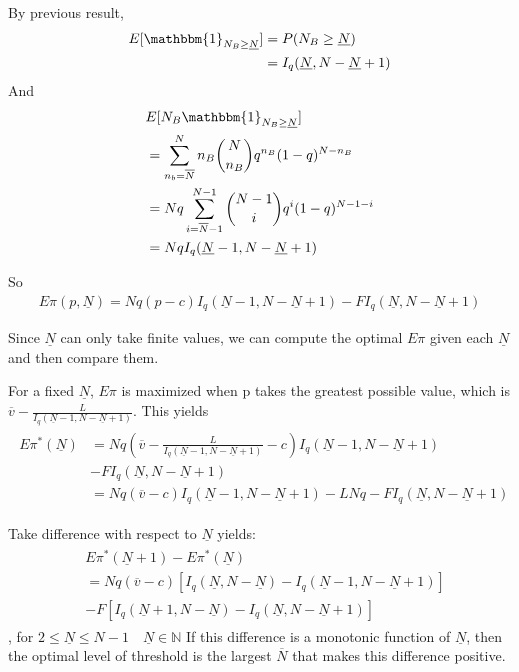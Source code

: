 \documentclass{article}
\begin{document}
By previous result,
\begin{align*}
    E[\mathbbm{1}_{N_B \geq \underline{N}}] &= P(N_B \geq \underline{N}) \\
    &= I_q(\underline{N}, N - \underline{N} + 1)
\end{align*}
And \begin{align*}
    &E[N_B \mathbbm{1}_{N_B \geq \underline{N}}]\\
    & = \sum_{n_b=\overline{N}}^{N} n_B \binom{N}{n_B} q^{n_B} (1-q)^{N-n_B}\\
    & = Nq \sum_{i=\overline{N}-1}^{N-1} \binom{N-1}{i} q^{i} (1-q)^{N-1-i}\\
    & = Nq I_q(\underline{N}-1, N - \underline{N} + 1)
\end{align*}

So \begin{align}
    E\pi(p,\underline{N}) = Nq(p-c)I_q(\underline{N}-1, N - \underline{N} + 1) - F I_q(\underline{N}, N - \underline{N} + 1)
\end{align}

Since $\underline{N}$ can only take finite values, we can
compute the optimal $E\pi$ given each $\underline{N}$ and
then compare them.

For a fixed $\underline{N}$, $E\pi$ is maximized when
p takes the greatest possible value, which is
$\overline{v} - \frac{L}{I_q(\underline{N}-1, N - \underline{N} + 1)}$.
This yields
\begin{align}
    \begin{split}
    E\pi^*(\underline{N}) 
    &= Nq(\overline{v} - \frac{L}{I_q(\underline{N}-1, N - \underline{N} + 1)} -c)
    I_q(\underline{N}-1, N - \underline{N} + 1) \\ 
    & - F I_q(\underline{N}, N - \underline{N} + 1) \\
    & = Nq(\overline{v} -c)I_q(\underline{N}-1, N - \underline{N} + 1)
    - LNq - F I_q(\underline{N}, N - \underline{N} + 1)
    \end{split}
\end{align}

Take difference with respect to $\underline{N}$ yields:
\begin{align}
    \begin{split}
    &E\pi^*(\underline{N}+1) - E\pi^*(\underline{N})\\
    &=Nq(\overline{v}-c)[I_q(\underline{N}, N - \underline{N}) - I_q(\underline{N}-1, N - \underline{N} + 1)]\\
    & -F[I_q(\underline{N}+1, N - \underline{N}) - I_q(\underline{N}, N - \underline{N} + 1)]
    \end{split}
\end{align}
, for $ 2 \leq \underline{N} \leq N-1 \quad \underline{N} \in \mathbb{N}$
If this difference is a monotonic function of $\underline{N}$, then
the optimal level of threshold is the largest $\overline{N}$
that makes this difference positive.
\end{document}
